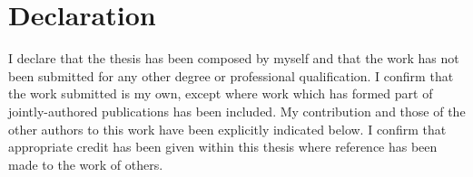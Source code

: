 \chapter*{Declaration}
I declare that the thesis has been composed by myself and that the work has not been
submitted for any other degree or professional qualification. I confirm that the work
submitted is my own, except where work which has formed part of jointly-authored
publications has been included. My contribution and those of the other authors to this
work have been explicitly indicated below. I confirm that appropriate credit has been
given within this thesis where reference has been made to the work of others.
